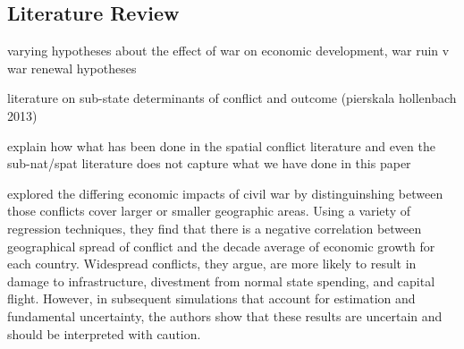 \subsection{Literature Review}
\label{lit}

varying hypotheses about the effect of war on economic development, war ruin v war renewal hypotheses

literature on sub-state determinants of conflict and outcome (pierskala hollenbach 2013)

	explain how what has been done in the spatial conflict literature and even the sub-nat/spat literature does not capture what we have done in this paper



\cite{imai:weinstein:2000} explored the differing economic impacts of civil war by distinguinshing between those conflicts cover larger or smaller geographic areas.  Using a variety of regression techniques, they find that there is a negative correlation between geographical spread of conflict and the decade average of economic growth for each country.  Widespread conflicts, they argue, are more likely to result in damage to infrastructure, divestment from normal state spending, and capital flight.  However, in subsequent simulations that account for estimation and fundamental uncertainty, the authors show that these results are uncertain and should be interpreted with caution.

